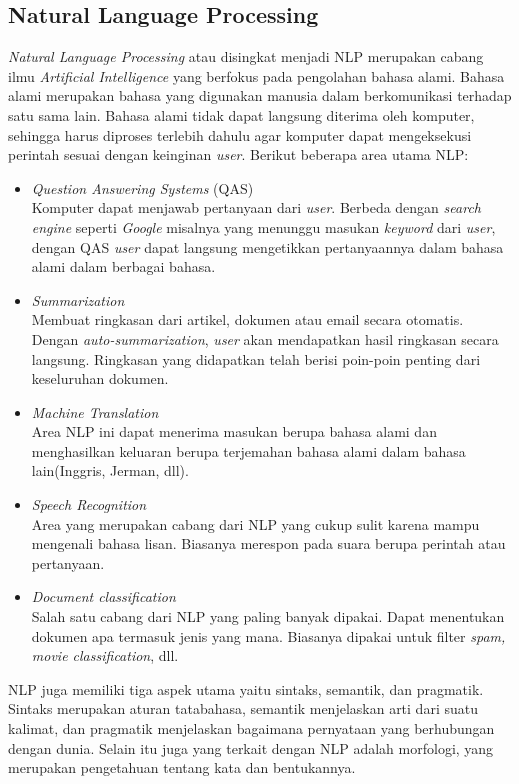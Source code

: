 \subsection{Natural Language Processing\cite{NLA:2003}}
\label{sec:nlp}

\textit{Natural Language Processing} atau disingkat menjadi NLP merupakan cabang ilmu \textit{Artificial Intelligence} yang berfokus pada pengolahan bahasa alami. Bahasa alami merupakan bahasa yang digunakan manusia dalam berkomunikasi terhadap satu sama lain. Bahasa alami tidak dapat langsung diterima oleh komputer, sehingga harus diproses terlebih dahulu agar komputer dapat mengeksekusi perintah sesuai dengan keinginan \textit{user}.  Berikut beberapa area utama NLP:

\begin{itemize}
	\item \textit{Question Answering Systems} (QAS)\\
	Komputer dapat menjawab pertanyaan dari \textit{user}. Berbeda dengan \textit{search engine} seperti \textit{Google} misalnya yang menunggu masukan \textit{keyword} dari \textit{user}, dengan QAS \textit{user} dapat langsung mengetikkan pertanyaannya dalam bahasa alami dalam berbagai bahasa.
	\item \textit{Summarization}\\
	Membuat ringkasan dari artikel, dokumen atau email secara otomatis. Dengan \textit{auto-summarization}, \textit{user} akan mendapatkan hasil ringkasan secara langsung. Ringkasan yang didapatkan telah berisi poin-poin penting dari keseluruhan dokumen.
	\item \textit{Machine Translation}\\
	Area NLP ini dapat menerima masukan berupa bahasa alami dan menghasilkan keluaran berupa terjemahan bahasa alami dalam bahasa lain(Inggris, Jerman, dll).
	\item \textit{Speech Recognition}\\
	Area yang merupakan cabang dari NLP yang cukup sulit karena mampu mengenali bahasa lisan. Biasanya merespon pada suara berupa perintah atau pertanyaan.
	\item \textit{Document classification}\\
	Salah satu cabang dari NLP yang paling banyak dipakai. Dapat menentukan dokumen apa termasuk jenis yang mana. Biasanya dipakai untuk filter \textit{spam, movie classification}, dll.
\end{itemize}

NLP juga memiliki tiga aspek utama yaitu sintaks, semantik, dan pragmatik. Sintaks merupakan aturan tatabahasa, semantik menjelaskan arti dari suatu kalimat, dan pragmatik menjelaskan bagaimana pernyataan yang berhubungan dengan dunia. Selain itu juga yang terkait dengan NLP adalah morfologi, yang merupakan pengetahuan tentang kata dan bentukannya.

